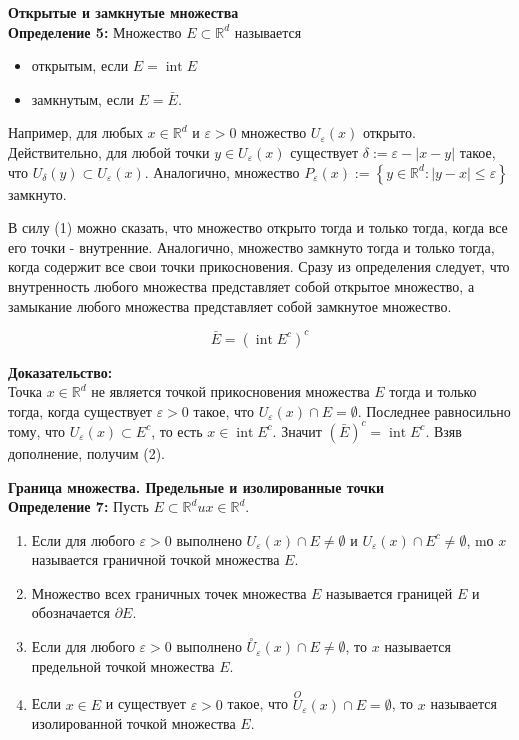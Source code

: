 \documentclass[a4paper,12pt]{article} %
\begin{document}
\textbf{Открытые и замкнутые множества}\\
\textbf{Определение 5:} Множество $E \subset \mathbb{R}^{d}$ называется

\begin{itemize}
  \item открытым, если $E=\operatorname{int} E$

  \item замкнутым, если $E=\bar{E}$.

\end{itemize}

Например, для любых $x \in \mathbb{R}^{d}$ и $\varepsilon>0$ множество $U_{\varepsilon}(x)$ открыто. Действительно, для любой точки $y \in U_{\varepsilon}(x)$ существует $\delta:=\varepsilon-|x-y|$ такое, что $U_{\delta}(y) \subset U_{\varepsilon}(x)$. Аналогично, множество $P_{\varepsilon}(x):=\left\{y \in \mathbb{R}^{d}:|y-x| \leq \varepsilon\right\}$ замкнуто.

В силу (1) можно сказать, что множество открыто тогда и только тогда, когда все его точки - внутренние. Аналогично, множество замкнуто тогда и только тогда, когда содержит все свои точки прикосновения. Сразу из определения следует, что внутренность любого множества представляет собой открытое множество, а замыкание любого множества представляет собой замкнутое множество.

$$
\bar{E}=\left(\operatorname{int} E^{c}\right)^{c}
$$

\textbf{Доказательство:}\\
Точка $x \in \mathbb{R}^{d}$ не является точкой прикосновения множества $E$ тогда и только тогда, когда существует $\varepsilon>0$ такое, что $U_{\varepsilon}(x) \cap E=\emptyset$. Последнее равносильно тому, что $U_{\varepsilon}(x) \subset E^{c}$, то есть $x \in \operatorname{int} E^{c}$. Значит $(\bar{E})^{c}=\operatorname{int} E^{c}$. Взяв дополнение, получим (2).

\textbf{Граница множества. Предельные и изолированные точки}\\
\textbf{Определение 7:} Пусть $E \subset \mathbb{R}^{d} u x \in \mathbb{R}^{d}$.

\begin{enumerate}
  \item Если для любого $\varepsilon>0$ выполнено $U_{\varepsilon}(x) \cap E \neq \emptyset$ и $U_{\varepsilon}(x) \cap E^{c} \neq \emptyset$, mо $x$ называется граничной точкой множества $E$.
  \item Множество всех граничных точек множества $E$ называется границей $E$ и обозначается $\partial E$.


  \item Если для любого $\varepsilon>0$ выполнено $\stackrel{\circ}{U}_{\varepsilon}(x) \cap E \neq \emptyset$, то $x$ называется предельной точкой множества $E$.

  \item Если $x \in E$ и существует $\varepsilon>0$ такое, что $\stackrel{O}{U}_{\varepsilon}(x) \cap E=\emptyset$, то $x$ называется изолированной точкой множества $E$.

\end{enumerate}
\end{document}

